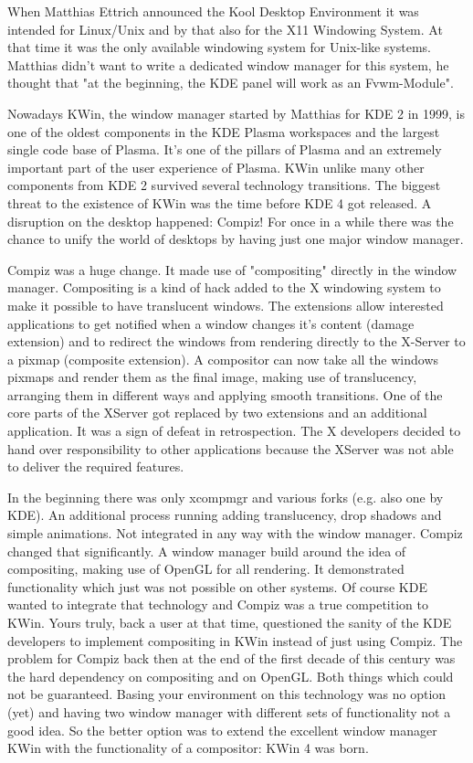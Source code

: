
\noindent{}When Matthias Ettrich announced the Kool Desktop Environment it was intended for Linux/Unix and by that also for the X11 Windowing System. At that time it was the only available windowing system for Unix-like systems. Matthias didn't want to write a dedicated window manager for this system, he thought that "at the beginning, the KDE panel will work as an Fvwm-Module".

Nowadays KWin, the window manager started by Matthias for KDE 2 in 1999, is one of the oldest components in the KDE Plasma workspaces and the largest single code base of Plasma. It's one of the pillars of Plasma and an extremely important part of the user experience of Plasma. KWin unlike many other components from KDE 2 survived several technology transitions. The biggest threat to the existence of KWin was the time before KDE 4 got released. A disruption on the desktop happened: Compiz! For once in a while there was the chance to unify the world of desktops by having just one major window manager.

Compiz was a huge change. It made use of "compositing" directly in the window manager. Compositing is a kind of hack added to the X windowing system to make it possible to have translucent windows. The extensions allow interested applications to get notified when a window changes it's content (damage extension) and to redirect the windows from rendering directly to the X-Server to a pixmap (composite extension). A compositor can now take all the windows pixmaps and render them as the final image, making use of translucency, arranging them in different ways and applying smooth transitions. One of the core parts of the XServer got replaced by two extensions and an additional application. It was a sign of defeat in retrospection. The X developers decided to hand over responsibility to other applications because the XServer was not able to deliver the required features.

In the beginning there was only xcompmgr and various forks (e.g. also one by KDE). An additional process running adding translucency, drop shadows and simple animations. Not integrated in any way with the window manager. Compiz changed that significantly. A window manager build around the idea of compositing, making use of OpenGL for all rendering. It demonstrated functionality which just was not possible on other systems. Of course KDE wanted to integrate that technology and Compiz was a true competition to KWin. Yours truly, back a user at that time, questioned the sanity of the KDE developers to implement compositing in KWin instead of just using Compiz. The problem for Compiz back then at the end of the first decade of this century was the hard dependency on compositing and on OpenGL. Both things which could not be guaranteed. Basing your environment on this technology was no option (yet) and having two window manager with different sets of functionality not a good idea. So the better option was to extend the excellent window manager KWin with the functionality of a compositor: KWin 4 was born.

